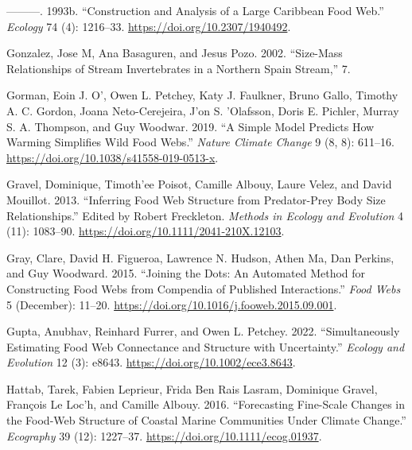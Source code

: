 \documentclass{article}
\newlength{\cslhangindent}
\newlength{\cslentryspacingunit} %
\newenvironment{CSLReferences}[2] %
 {%
  \setlength{\parindent}{0pt}
  \ifodd #1
  \let\oldpar\par
  \def\par{\hangindent=\cslhangindent\oldpar}
  \fi
  \setlength{\parskip}{#2\cslentryspacingunit}
 }%
 {}
\begin{document}
\begin{CSLReferences}{1}{0}
\leavevmode{}%
---------. 1993b. {``Construction and Analysis of a Large Caribbean Food
Web.''} \emph{Ecology} 74 (4): 1216--33.
\url{https://doi.org/10.2307/1940492}.

\leavevmode{}%
Gonzalez, Jose M, Ana Basaguren, and Jesus Pozo. 2002. {``Size-Mass
Relationships of Stream Invertebrates in a Northern {Spain} Stream,''}
7.

\leavevmode{}%
Gorman, Eoin J. O', Owen L. Petchey, Katy J. Faulkner, Bruno Gallo,
Timothy A. C. Gordon, Joana Neto-Cerejeira, J'on S. 'Olafsson, Doris E.
Pichler, Murray S. A. Thompson, and Guy Woodwar. 2019. {``A Simple Model
Predicts How Warming Simplifies Wild Food Webs.''} \emph{Nature Climate
Change} 9 (8, 8): 611--16.
\url{https://doi.org/10.1038/s41558-019-0513-x}.

\leavevmode{}%
Gravel, Dominique, Timoth'ee Poisot, Camille Albouy, Laure Velez, and
David Mouillot. 2013. {``Inferring Food Web Structure from Predator-Prey
Body Size Relationships.''} Edited by Robert Freckleton. \emph{Methods
in Ecology and Evolution} 4 (11): 1083--90.
\url{https://doi.org/10.1111/2041-210X.12103}.

\leavevmode{}%
Gray, Clare, David H. Figueroa, Lawrence N. Hudson, Athen Ma, Dan
Perkins, and Guy Woodward. 2015. {``Joining the Dots: {An} Automated
Method for Constructing Food Webs from Compendia of Published
Interactions.''} \emph{Food Webs} 5 (December): 11--20.
\url{https://doi.org/10.1016/j.fooweb.2015.09.001}.

\leavevmode{}%
Gupta, Anubhav, Reinhard Furrer, and Owen L. Petchey. 2022.
{``Simultaneously Estimating Food Web Connectance and Structure with
Uncertainty.''} \emph{Ecology and Evolution} 12 (3): e8643.
\url{https://doi.org/10.1002/ece3.8643}.

\leavevmode{}%
Hattab, Tarek, Fabien Leprieur, Frida Ben Rais Lasram, Dominique Gravel,
François Le Loc'h, and Camille Albouy. 2016. {``Forecasting Fine-Scale
Changes in the Food-Web Structure of Coastal Marine Communities Under
Climate Change.''} \emph{Ecography} 39 (12): 1227--37.
\url{https://doi.org/10.1111/ecog.01937}.


\end{CSLReferences}
\end{document}
